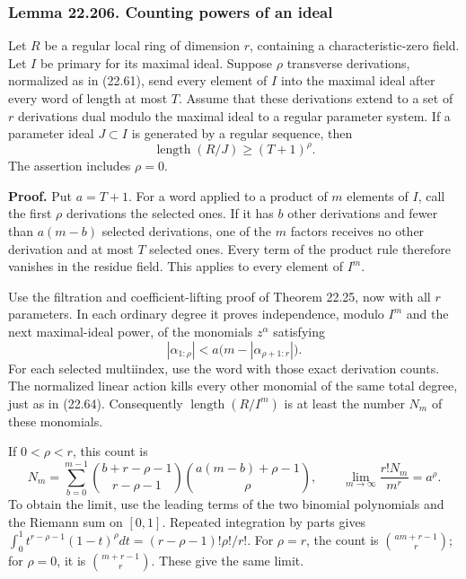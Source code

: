\documentclass[
  11pt,
  a4paper,
]{article}
\begin{document}
\subsubsection{Lemma 22.206. Counting powers of an
ideal}\label{lemma-22.206.-counting-powers-of-an-ideal}

Let \(R\) be a regular local ring of dimension \(r\), containing a
characteristic-zero field. Let \(I\) be primary for its maximal ideal.
Suppose \(\rho\) transverse derivations, normalized as in (22.61), send
every element of \(I\) into the maximal ideal after every word of length
at most \(T\). Assume that these derivations extend to a set of \(r\)
derivations dual modulo the maximal ideal to a regular parameter system.
If a parameter ideal \(J\subset I\) is generated by a regular sequence,
then \[
 \operatorname{length}(R/J)\ge(T+1)^\rho.
 \tag{22.612}
\] The assertion includes \(\rho=0\).

\textbf{Proof.} Put \(a=T+1\). For a word applied to a product of \(m\)
elements of \(I\), call the first \(\rho\) derivations the selected
ones. If it has \(b\) other derivations and fewer than \(a(m-b)\)
selected derivations, one of the \(m\) factors receives no other
derivation and at most \(T\) selected ones. Every term of the product
rule therefore vanishes in the residue field. This applies to every
element of \(I^m\).

Use the filtration and coefficient-lifting proof of Theorem 22.25, now
with all \(r\) parameters. In each ordinary degree it proves
independence, modulo \(I^m\) and the next maximal-ideal power, of the
monomials \(z^\alpha\) satisfying \[
 |\alpha_{1:\rho}|<a\bigl(m-|\alpha_{\rho+1:r}|\bigr).
 \tag{22.613}
\] For each selected multiindex, use the word with those exact
derivation counts. The normalized linear action kills every other
monomial of the same total degree, just as in (22.64). Consequently
\(\operatorname{length}(R/I^m)\) is at least the number \(N_m\) of these
monomials.

If \(0<\rho<r\), this count is \[
 N_m=\sum_{b=0}^{m-1}
       \binom{b+r-\rho-1}{r-\rho-1}
       \binom{a(m-b)+\rho-1}{\rho},\qquad
 \lim_{m\to\infty}\frac{r!N_m}{m^r}=a^\rho.
 \tag{22.614}
\] To obtain the limit, use the leading terms of the two binomial
polynomials and the Riemann sum on \([0,1]\). Repeated integration by
parts gives \(\int_0^1t^{r-\rho-1}(1-t)^\rho dt
=(r-\rho-1)!\rho!/r!\). For \(\rho=r\), the count is
\(\binom{am+r-1}{r}\); for \(\rho=0\), it is \(\binom{m+r-1}{r}\). These
give the same limit.
\end{document}
